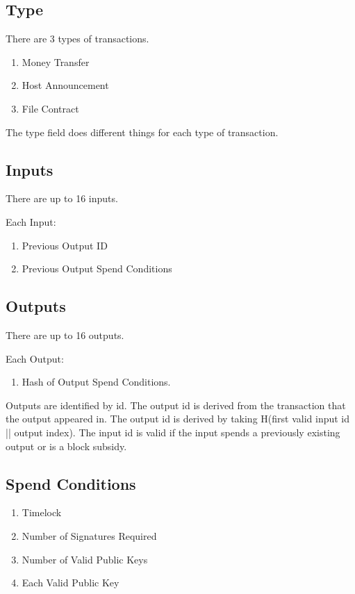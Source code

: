 \documentclass[twocolumn]{article}
\begin{document}
\subsection{Type}
There are 3 types of transactions.
\begin{enumerate}
	\item Money Transfer
	\item Host Announcement
	\item File Contract
\end{enumerate}

The type field does different things for each type of transaction.

\subsection{Inputs}
There are up to 16 inputs.

Each Input:
\begin{enumerate}
	\item Previous Output ID
	\item Previous Output Spend Conditions
\end{enumerate}

\subsection{Outputs}
There are up to 16 outputs.

Each Output:
\begin{enumerate}
	\item Hash of Output Spend Conditions.
\end{enumerate}

Outputs are identified by id.
The output id is derived from the transaction that the output appeared in.
The output id is derived by taking H(first valid input id || output index).
The input id is valid if the input spends a previously existing output or is a block subsidy.

\subsection{Spend Conditions}
\begin{enumerate}
	\item Timelock
	\item Number of Signatures Required
	\item Number of Valid Public Keys
	\item Each Valid Public Key
\end{enumerate}
\end{document}
